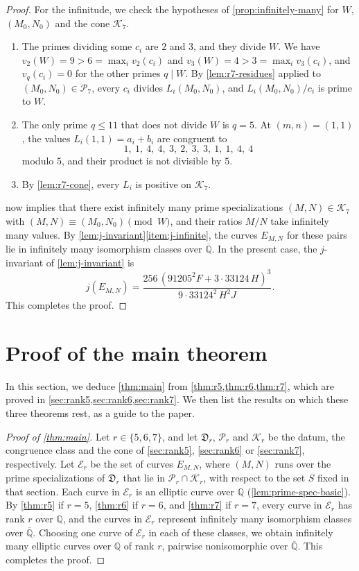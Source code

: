 \documentclass[12pt,oneside,openany]{book}
\theoremstyle{definition}
\theoremstyle{plain}
\numberwithin{equation}{chapter}
\theoremstyle{plain}
\theoremstyle{definition}
\theoremstyle{remark}
\newcommand{\Q}{\mathbb Q}
\newcommand{\Qbar}{\overline{\mathbb Q}}
\newcommand{\datum}{\mathfrak D}
\newcommand{\cP}{\mathcal P}
\newcommand{\cK}{\mathcal K}
\begin{document}
\begin{proof}
For the infinitude, we check the hypotheses of
\cref{prop:infinitely-many} for $W$, $(M_0,N_0)$ and the cone $\cK_7$.
\begin{enumerate}[label=(\alph*)]
\item[\ref{item:inf-progression}] The primes dividing some $c_i$ are $2$ and $3$, and they divide $W$.
We have $v_2(W)=9>6=\max_iv_2(c_i)$ and $v_3(W)=4>3=\max_iv_3(c_i)$, and
$v_q(c_i)=0$ for the other primes $q\mid W$. By \cref{lem:r7-residues}
applied to $(M_0,N_0)\in\cP_7$, every $c_i$ divides $L_i(M_0,N_0)$, and
$L_i(M_0,N_0)/c_i$ is prime to $W$.
\item[\ref{item:inf-small-primes}] The only prime $q\le11$ that does not divide $W$ is $q=5$. At
$(m,n)=(1,1)$, the values $L_i(1,1)=a_i+b_i$ are congruent to
\[
 1,\ 1,\ 4,\ 4,\ 3,\ 2,\ 3,\ 3,\ 1,\ 1,\ 4,\ 4
\]
modulo $5$, and their product is not divisible by $5$.
\item[\ref{item:inf-cone}] By \cref{lem:r7-cone}, every $L_i$ is positive on $\cK_7$.
\end{enumerate}
 now implies that there exist infinitely many prime
specializations $(M,N)\in\cK_7$ with $(M,N)\equiv(M_0,N_0)\pmod W$, and
their ratios $M/N$ take infinitely many values. By
\cref{lem:j-invariant}\ref{item:j-infinite}, the curves $E_{M,N}$ for these
pairs lie in infinitely many isomorphism classes over $\Qbar$. In the
present case, the $j$-invariant of \cref{lem:j-invariant} is
\[
 j(E_{M,N})=\frac{256\,(91205^2F+3\cdot33124\,H)^3}{9\cdot33124^2\,H^2J}.
\]
This completes the proof.
\end{proof}
\chapter{Proof of the main theorem}\label{sec:proof}

In this section, we deduce \cref{thm:main} from \cref{thm:r5,thm:r6,thm:r7}, which are proved in \cref{sec:rank5,sec:rank6,sec:rank7}. We then list the results on which these three theorems rest, as a guide to the paper.

\begin{proof}[Proof of \cref{thm:main}]
Let $r\in\{5,6,7\}$, and let $\datum_r$, $\cP_r$ and $\cK_r$ be the datum, the congruence class and the cone of \cref{sec:rank5}, \cref{sec:rank6} or \cref{sec:rank7}, respectively. Let $\mathcal E_r$ be the set of curves $E_{M,N}$, where $(M,N)$ runs over the prime specializations of $\datum_r$ that lie in $\cP_r\cap\cK_r$, with respect to the set $S$ fixed in that section. Each curve in $\mathcal E_r$ is an elliptic curve over $\Q$ (\cref{lem:prime-spec-basic}). By \cref{thm:r5} if $r=5$, \cref{thm:r6} if $r=6$, and \cref{thm:r7} if $r=7$, every curve in $\mathcal E_r$ has rank $r$ over $\Q$, and the curves in $\mathcal E_r$ represent infinitely many isomorphism classes over $\Qbar$. Choosing one curve of $\mathcal E_r$ in each of these classes, we obtain infinitely many elliptic curves over $\Q$ of rank $r$, pairwise nonisomorphic over $\Qbar$. This completes the proof.
\end{proof}
\end{document}
